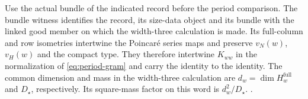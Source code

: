 %
Use the actual bundle of the indicated record before the period
comparison. The bundle witness identifies the record, its size-data
object and its bundle with the linked good member on which the
width-three calculation is made. Its full-column and row isometries
intertwine the Poincar\'e series maps and preserve \(v_N(w)\), \(v_H(w)\)
and the compact type. They therefore intertwine \(K_{ww}\) in the normalization
of \eqref{eq:period-gram} and carry the identity to the identity.
The common dimension and mass in the width-three calculation are
\(d_w=\dim H_w^{\mathrm{full}}\) and \(D_\star\), respectively. Its
square-mass factor on this word is \(d_w^2/D_\star\).
.


